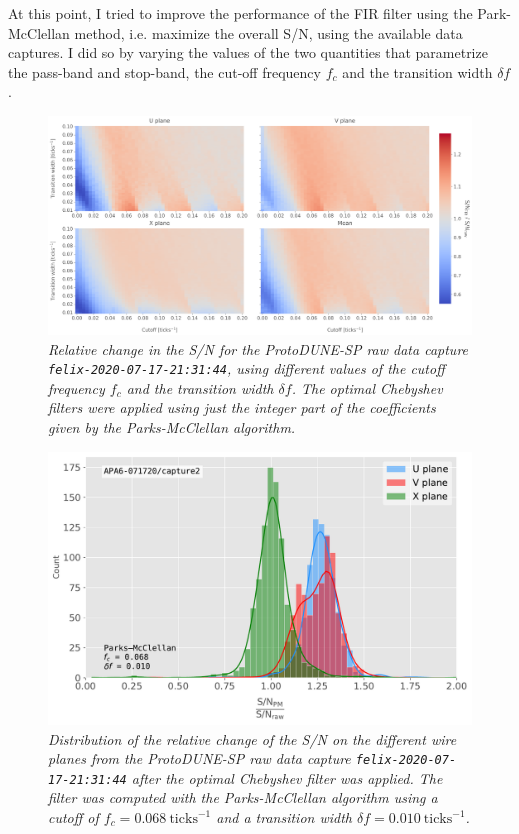 At this point, I tried to improve the performance of the FIR filter using the Park-McClellan method, i.e. maximize the overall S/N, using the available data captures. I did so by varying the values of the two quantities that parametrize the pass-band and stop-band, the cut-off frequency $f_{c}$ and the transition width $\delta f$.

\begin{figure}[t]
	\centering
	\includegraphics[width=1\linewidth]{Images/Matched_Filter/pm_fir_opt.png}
	\caption{\textit{Relative change in the S/N for the ProtoDUNE-SP raw data capture \texttt{felix-2020-07-17-21:31:44}, using different values of the cutoff frequency $f_{c}$ and the transition width $\delta f$. The optimal Chebyshev filters were applied using just the integer part of the coefficients given by the Parks-McClellan algorithm.}}
	\label{fig:fir_opt}
\end{figure}

\begin{figure}[t]
	\centering
	\includegraphics[width=0.85\linewidth]{Images/Matched_Filter/pm_fir_perf}
	\caption{\textit{Distribution of the relative change of the S/N on the different wire planes from the ProtoDUNE-SP raw data capture \texttt{felix-2020-07-17-21:31:44} after the optimal Chebyshev filter was applied. The filter was computed with the Parks-McClellan algorithm using a cutoff of $f_{c} = 0.068 \ \mathrm{ticks}^{-1}$ and a transition width $\delta f = 0.010 \ \mathrm{ticks}^{-1}$.}}
	\label{fig:fir_best}
\end{figure}

